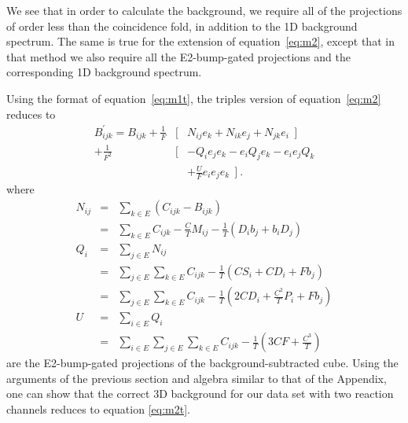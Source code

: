We see that in order to calculate the background, we require all of the
projections of order less than the coincidence fold, in addition to the 1D
background spectrum. The same is true for the extension of
equation~\ref{eq:m2}, except that in that method we also require all the
E2-bump-gated projections and the corresponding 1D background spectrum.

Using the format of equation~\ref{eq:m1t}, the triples version of
equation~\ref{eq:m2} reduces to
\begin{eqnarray}
B^{\prime}_{ijk} = B_{ijk} + \frac {1}{F}
 & [ & N_{ij}e_k + N_{ik}e_j + N_{jk}e_i \ \ ]     \nonumber \\
+ \frac {1}{F^2}
 & [ & - Q_i e_j e_k - e_i Q_j e_k - e_i e_j Q_k   \nonumber \\
 &   & +  \frac {U}{F} e_i e_j e_k \ \ ] \ .       \label{eq:m2t} 
\end{eqnarray}
where
\begin{eqnarray}
N_{ij} & = & \sum_{k \in E} (C_{ijk} - B_{ijk})               \nonumber \\
       & = & \sum_{k \in E} C_{ijk} - \frac {C}{T} M_{ij}
                       - \frac {1}{T} (D_i b_j + b_i D_j)     \\
Q_i    & = & \sum_{j \in E} N_{ij}                            \nonumber \\
       & = & \sum_{j \in E} \sum_{k \in E}  C_{ijk}
                   - \frac {1}{T} (C S_i + C D_i + F b_j)     \nonumber \\
       & = & \sum_{j \in E} \sum_{k \in E}  C_{ijk}
       - \frac {1}{T} (2 C D_i + \frac {C^2}{T} P_i + F b_j)  \\
U      & = & \sum_{i \in E} Q_i                               \nonumber \\
       & = & \sum_{i \in E} \sum_{j \in E}
             \sum_{k \in E}  C_{ijk} - \frac {1}{T} (3CF + \frac {C^3}{T})
\end{eqnarray}
are the E2-bump-gated projections of the background-subtracted cube.
Using the arguments of the previous section and algebra similar to that of the
Appendix, one can show that the correct 3D background for our data set with two
reaction channels reduces to equation \ref{eq:m2t}.


